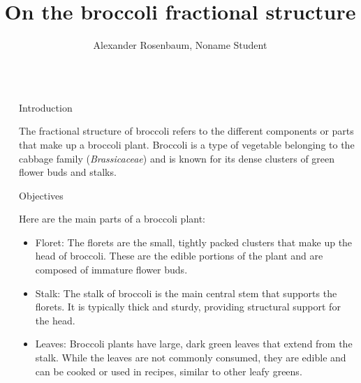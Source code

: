 \documentclass[]{beamer}
\title{On the broccoli fractional structure}
\author{Alexander Rosenbaum, Noname Student}
\begin{document}
\nocite{*} %

\begin{frame}[t]
    \begin{columns}[t] %
     
    \begin{column}{\lrmargin}\end{column} %
    
    \begin{column}{\onecolwid} %
     
    
    \begin{block}{Introduction}
    
    The fractional structure of broccoli refers to the different components or parts that make up a broccoli plant. Broccoli is a type of vegetable belonging to the cabbage family (\textit{Brassicaceae}) and is known for its dense clusters of green flower buds and stalks. 
    
    \end{block}
    
    
    \begin{alertblock}{Objectives}
    
    Here are the main parts of a broccoli plant:
    \begin{itemize}
        \item Floret: The florets are the small, tightly packed clusters that make up the head of broccoli. These are the edible portions of the plant and are composed of immature flower buds.

    	\item Stalk: The stalk of broccoli is the main central stem that supports the florets. It is typically thick and sturdy, providing structural support for the head.

    	\item Leaves: Broccoli plants have large, dark green leaves that extend from the stalk. While the leaves are not commonly consumed, they are edible and can be cooked or used in recipes, similar to other leafy greens.


\end{itemize}
\end{alertblock}
\end{column}
\end{columns}
\end{frame}
\end{document}

